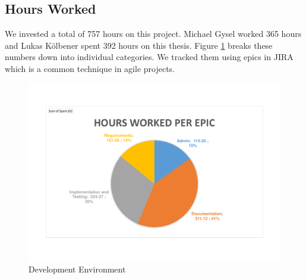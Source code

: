 \subsection{Hours Worked}

We invested a total of 757 hours on this project. Michael Gysel worked 365 hours and Lukas Kölbener spent 392 hours on this thesis. Figure \ref{fig:hoursworked} breaks these numbers down into individual categories. We tracked them using epics in JIRA\cite{jira} which is a common technique in agile projects.

\begin{figure}[H]
	\includegraphics[scale=0.7]{diagrams/hoursperepic.pdf}
	\caption{Development Environment}
	\label{fig:hoursworked}
\end{figure}